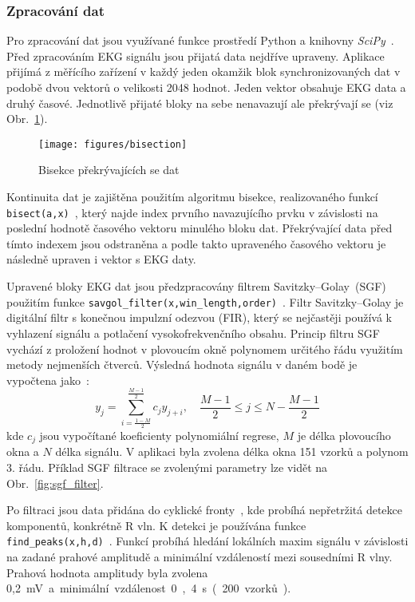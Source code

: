 \subsubsection{Zpracování dat}
\label{section:online_data_process}
Pro zpracování dat jsou využívané funkce prostředí Python a knihovny
\textit{SciPy}~\cite{SciPy2020}. Před zpracováním EKG signálu jsou přijatá data
nejdříve upraveny. Aplikace přijímá z měřícího zařízení v každý jeden okamžik
blok synchronizovaných dat v podobě dvou vektorů o velikosti 2048 hodnot. Jeden
vektor obsahuje EKG data a druhý časové. Jednotlivě přijaté bloky na sebe
nenavazují ale překrývají se (viz Obr.~\ref{fig:bisection}).
\begin{figure}[h]
    \begin{center}
        \texttt{[image: figures/bisection]}
        \caption{Bisekce překrývajících se dat}
        \label{fig:bisection}
    \end{center}
\end{figure}
Kontinuita dat je zajištěna použitím algoritmu bisekce, realizovaného funkcí
\texttt{bisect(a,x)}~\cite{bisectRight}, který najde index prvního navazujícího
prvku v závislosti na poslední hodnotě časového vektoru minulého bloku dat.
Překrývající data před tímto indexem jsou odstraněna a podle takto upraveného
časového vektoru je následně upraven i vektor s EKG daty.

Upravené bloky EKG dat jsou předzpracovány filtrem
Savitzky–Golay~(SGF)~\cite{Schafer2011} použitím funkce
\texttt{savgol{\_}filter(x,win{\_}length,order)}~\cite{scipySavgol}. Filtr
Savitzky–Golay je digitální filtr s konečnou impulzní odezvou (FIR), který se
nejčastěji používá k vyhlazení signálu a potlačení vysokofrekvenčního obsahu.
Princip filtru SGF vychází z proložení hodnot v plovoucím okně polynomem
určitého řádu využitím metody nejmenších čtverců. Výsledná hodnota signálu v
daném bodě je vypočtena jako~\cite{wikiSGF}:
\begin{equation}
    y_j = \sum_{i=\frac{1-M}{2}}^{\frac{M-1}{2}} c_j y_{j+i}, \quad \frac{M-1}{2} \leq j \leq N - \frac{M-1}{2}
\end{equation}
kde $c_j$ jsou vypočítané koeficienty polynomiální regrese, $M$ je délka
plovoucího okna a $N$ délka signálu. V aplikaci byla zvolena délka okna 151
vzorků a polynom 3. řádu. Příklad SGF filtrace se zvolenými parametry lze vidět
na Obr.~\ref{fig:sgf_filter}.

Po filtraci jsou data přidána do cyklické fronty~\cite{circlebuffer}, kde
probíhá nepřetržitá detekce komponentů, konkrétně R vln. K detekci je používána
funkce \texttt{find{\_}peaks(x,h,d)}~\cite{scipyFindpeaks}. Funkcí probíhá
hledání lokálních maxim signálu v závislosti na zadané prahové amplitudě a
minimální vzdáleností mezi sousedními R vlny. Prahová hodnota amplitudy byla
zvolena 0,2~\si\mV~a minimální vzdálenost 0,4~\si\s~(200 vzorků).

